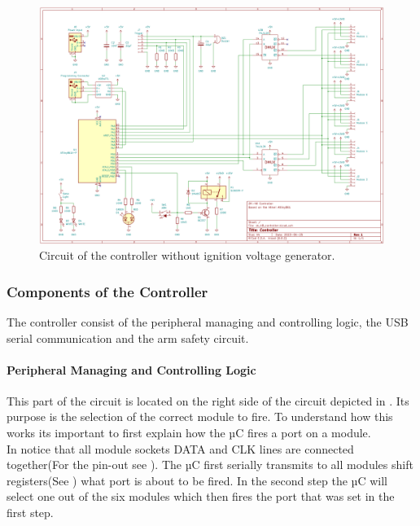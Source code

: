 \begin{figure}[!ht]
    \centering
    \includegraphics[width=15cm]{./Figures/controller_circuit.png}
    \caption{Circuit of the controller without ignition voltage generator.}
    \label{fig:controller_circuit}     
\end{figure}

\pagebreak

\subsubsection{Components of the Controller}
\label{Components of the Controller}
The controller consist of the peripheral managing and controlling logic, the USB serial communication and the arm safety circuit. 

\paragraph{Peripheral Managing and Controlling Logic}
This part of the circuit is located on the right side of the circuit depicted in . Its purpose is the selection of the correct module to fire. To understand how this works its important to first explain how the µC fires a port on a module.\\

\noindent In  notice that all module sockets DATA and CLK lines are connected together(For the pin-out see ). The µC first serially transmits to all modules shift registers(See ) what port is about to be fired. In the second step the µC will select one out of the six modules which then fires the port that was set in the first step.\\


